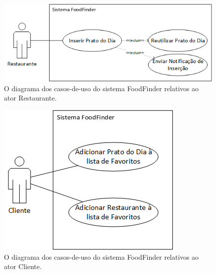 \documentclass[a4paper,12pt]{report}
\begin{document}
	\begin{figure}[H]
	\begin{center}
	\includegraphics[scale=0.70]{casoUso_restaurante}	
	\end{center}
	\medskip
	\caption{O diagrama dos casos-de-uso do sistema FoodFinder relativos ao ator Restaurante.}
	\label{fig:casoUso_restaurante}	
	\end{figure}
	
	\begin{figure}[H]
	\begin{center}
	\includegraphics[scale=0.70]{casoUso_cliente}	
	\end{center}
	\medskip
	\caption{O diagrama dos casos-de-uso do sistema FoodFinder relativos ao ator Cliente.}
	\label{fig:casoUso_cliente}	
	\end{figure}	
	
\end{document}
